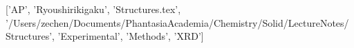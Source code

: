 ['AP', 'Ryoushirikigaku', 'Structures.tex', '/Users/zechen/Documents/PhantasiaAcademia/Chemistry/Solid/LectureNotes/Structures', 'Experimental', 'Methods', 'XRD']
